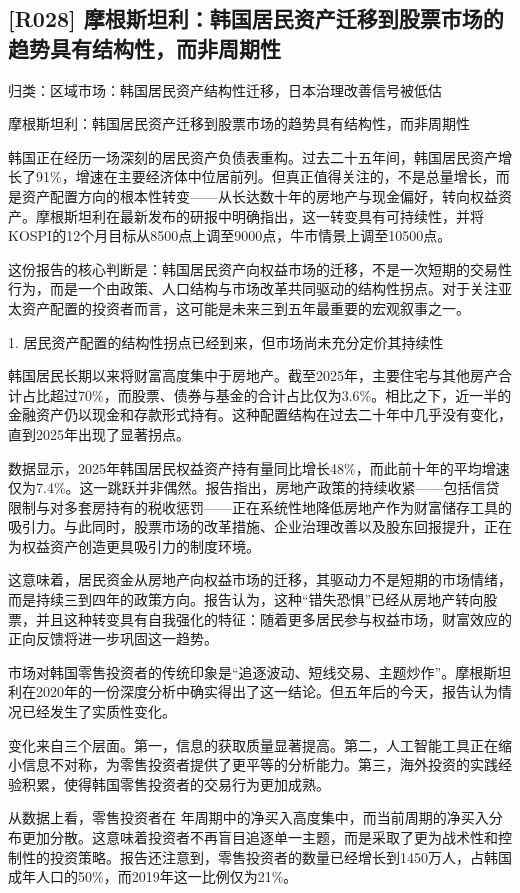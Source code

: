 \documentclass[11pt]{ctexart}
\begin{document}
\subsection{[R028] 摩根斯坦利：韩国居民资产迁移到股票市场的趋势具有结构性，而非周期性}
{\small\color{refgray}归类：区域市场：韩国居民资产结构性迁移，日本治理改善信号被低估}

摩根斯坦利：韩国居民资产迁移到股票市场的趋势具有结构性，而非周期性

韩国正在经历一场深刻的居民资产负债表重构。过去二十五年间，韩国居民资产增长了91\%，增速在主要经济体中位居前列。但真正值得关注的，不是总量增长，而是资产配置方向的根本性转变——从长达数十年的房地产与现金偏好，转向权益资产。摩根斯坦利在最新发布的研报中明确指出，这一转变具有可持续性，并将KOSPI的12个月目标从8500点上调至9000点，牛市情景上调至10500点。

这份报告的核心判断是：韩国居民资产向权益市场的迁移，不是一次短期的交易性行为，而是一个由政策、人口结构与市场改革共同驱动的结构性拐点。对于关注亚太资产配置的投资者而言，这可能是未来三到五年最重要的宏观叙事之一。

1. 居民资产配置的结构性拐点已经到来，但市场尚未充分定价其持续性

韩国居民长期以来将财富高度集中于房地产。截至2025年，主要住宅与其他房产合计占比超过70\%，而股票、债券与基金的合计占比仅为3.6\%。相比之下，近一半的金融资产仍以现金和存款形式持有。这种配置结构在过去二十年中几乎没有变化，直到2025年出现了显著拐点。

数据显示，2025年韩国居民权益资产持有量同比增长48\%，而此前十年的平均增速仅为7.4\%。这一跳跃并非偶然。报告指出，房地产政策的持续收紧——包括信贷限制与对多套房持有的税收惩罚——正在系统性地降低房地产作为财富储存工具的吸引力。与此同时，股票市场的改革措施、企业治理改善以及股东回报提升，正在为权益资产创造更具吸引力的制度环境。

这意味着，居民资金从房地产向权益市场的迁移，其驱动力不是短期的市场情绪，而是持续三到四年的政策方向。报告认为，这种“错失恐惧”已经从房地产转向股票，并且这种转变具有自我强化的特征：随着更多居民参与权益市场，财富效应的正向反馈将进一步巩固这一趋势。

市场对韩国零售投资者的传统印象是“追逐波动、短线交易、主题炒作”。摩根斯坦利在2020年的一份深度分析中确实得出了这一结论。但五年后的今天，报告认为情况已经发生了实质性变化。

变化来自三个层面。第一，信息的获取质量显著提高。第二，人工智能工具正在缩小信息不对称，为零售投资者提供了更平等的分析能力。第三，海外投资的实践经验积累，使得韩国零售投资者的交易行为更加成熟。

从数据上看，零售投资者在 年周期中的净买入高度集中，而当前周期的净买入分布更加分散。这意味着投资者不再盲目追逐单一主题，而是采取了更为战术性和控制性的投资策略。报告还注意到，零售投资者的数量已经增长到1450万人，占韩国成年人口的50\%，而2019年这一比例仅为21\%。
\end{document}
